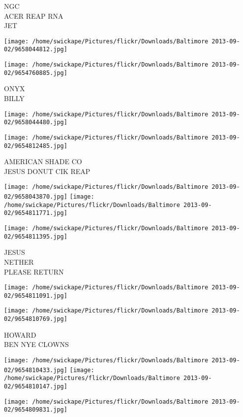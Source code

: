 \documentclass[10pt,letterpaper]{article}
\begin{document}
NGC\\
ACER REAP RNA\\
JET
\pagebreak

\texttt{[image: /home/swickape/Pictures/flickr/Downloads/Baltimore 2013-09-02/9658044812.jpg]}

\vspace{0.25in}
\texttt{[image: /home/swickape/Pictures/flickr/Downloads/Baltimore 2013-09-02/9654760885.jpg]}

ONYX\\
BILLY
\pagebreak

\texttt{[image: /home/swickape/Pictures/flickr/Downloads/Baltimore 2013-09-02/9658044480.jpg]}

\vspace{0.25in}
\texttt{[image: /home/swickape/Pictures/flickr/Downloads/Baltimore 2013-09-02/9654812485.jpg]}

AMERICAN SHADE CO\\
JESUS DONUT CIK REAP
\pagebreak

\texttt{[image: /home/swickape/Pictures/flickr/Downloads/Baltimore 2013-09-02/9658043870.jpg]}
\texttt{[image: /home/swickape/Pictures/flickr/Downloads/Baltimore 2013-09-02/9654811771.jpg]}

\vspace{0.25in}
\texttt{[image: /home/swickape/Pictures/flickr/Downloads/Baltimore 2013-09-02/9654811395.jpg]}

JESUS\\
NETHER\\
PLEASE RETURN
\pagebreak

\texttt{[image: /home/swickape/Pictures/flickr/Downloads/Baltimore 2013-09-02/9654811091.jpg]}

\vspace{0.25in}
\texttt{[image: /home/swickape/Pictures/flickr/Downloads/Baltimore 2013-09-02/9654810769.jpg]}

HOWARD\\
BEN NYE CLOWNS
\pagebreak

\texttt{[image: /home/swickape/Pictures/flickr/Downloads/Baltimore 2013-09-02/9654810433.jpg]}
\texttt{[image: /home/swickape/Pictures/flickr/Downloads/Baltimore 2013-09-02/9654810147.jpg]}

\texttt{[image: /home/swickape/Pictures/flickr/Downloads/Baltimore 2013-09-02/9654809831.jpg]}
\end{document}
